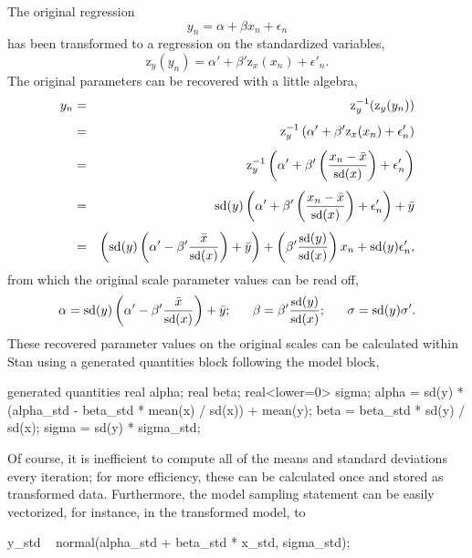 The original regression
\[
y_n 
= \alpha + \beta x_n + \epsilon_n
\]
has been transformed to a regression on the standardized variables,
\[
\mbox{z}_y(y_n)
= \alpha'
+ \beta' \mbox{z}_x(x_n)
+ \epsilon'_n.
\]
The original parameters can be recovered with a little algebra,
%
\begin{eqnarray*}
y_n 
& = & \mbox{z}_y^{-1}(\mbox{z}_y(y_n))
\\[4pt]
& = & 
\mbox{z}_y^{-1} 
\left( 
\alpha' 
+ \beta' \mbox{z}_x(x_n)
+ \epsilon_n'
\right)
\\[4pt]
& = & 
\mbox{z}_y^{-1} 
\left( 
\alpha' 
+ \beta' 
    \left(  
      \frac{x_n - \bar{x}}{\mbox{\small sd}(x)}
    \right)
+ \epsilon_n'
\right)
\\[4pt]
& = & 
\mbox{sd}(y)
\left( 
\alpha' 
+ \beta' 
    \left(  
      \frac{x_n - \bar{x}}{\mbox{\small sd}(x)}
    \right)
+ \epsilon_n'
\right)
+ \bar{y}
\\[4pt]
& = & 
\left( 
  \mbox{sd}(y) 
      \left( 
          \alpha' 
          - \beta' \frac{\bar{x}}{\mbox{\small sd}(x)}
      \right) 
  + \bar{y}  
\right)
+ \left(
      \beta' \frac{\mbox{\small sd}(y)}{\mbox{\small sd}(x)} 
  \right) x_n
+ \mbox{sd}(y) \epsilon'_n,
\end{eqnarray*}
%
from which the original scale parameter values can be read off,
\[
\alpha 
=
\mbox{sd}(y) 
      \left( 
          \alpha' 
          - \beta' \frac{\bar{x}}{\mbox{\small sd}(x)}
      \right) 
  + \bar{y};
\ \ \ \ \ 
\beta = \beta' \frac{\mbox{\small sd}(y)}{\mbox{\small sd}(x)};
\ \ \ \ \
\sigma = \mbox{sd}(y) \sigma'.
\]
%
These recovered parameter values on the original scales can be
calculated within Stan using a generated quantities block following
the model block,
\begin{stancode}
generated quantities {
  real alpha;
  real beta;
  real<lower=0> sigma;
  alpha = sd(y) * (alpha_std - beta_std * mean(x) / sd(x)) 
           + mean(y);
  beta = beta_std * sd(y) / sd(x);
  sigma = sd(y) * sigma_std;
}
\end{stancode}
%
Of course, it is inefficient to compute all of the means and standard
deviations every iteration; for more efficiency, these can be
calculated once and stored as transformed data.  Furthermore, the
model sampling statement can be easily vectorized, for instance, in
the transformed model, to
\begin{stancode}
    y_std ~ normal(alpha_std + beta_std * x_std, sigma_std);
\end{stancode}



